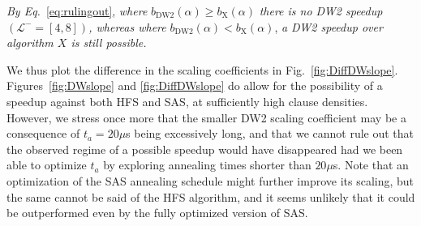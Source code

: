 \emph{By Eq.}~\eqref{eq:rulingout}, \emph{where} $b_{\textrm{DW2}}(\alpha) \geq b_{\textrm{X}}(\alpha)$ \emph{there is no DW2 speedup $(\mathcal{L}^- = [4,8])$, whereas where} $b_{\textrm{DW2}}(\alpha) < b_{\textrm{X}}(\alpha)$, \emph{a DW2 speedup over algorithm $X$ is still possible.}

We thus plot the difference in the scaling coefficients in Fig.~\ref{fig:DiffDWslope}. Figures~\ref{fig:DWslope} and \ref{fig:DiffDWslope} do allow for the possibility of a speedup against both HFS and SAS, at sufficiently high clause densities. However, we stress once more that the smaller DW2 scaling coefficient may be a consequence of $t_a=20\mu$s being excessively long, and that we cannot rule out that the observed regime of a possible speedup would have disappeared had we been able to optimize $t_a$ by exploring annealing times shorter than $20\mu$s. Note that an optimization of the SAS annealing schedule might further improve its scaling, but the same cannot be said of the HFS algorithm,
and it seems unlikely that it could be outperformed even by the fully optimized version of SAS.



